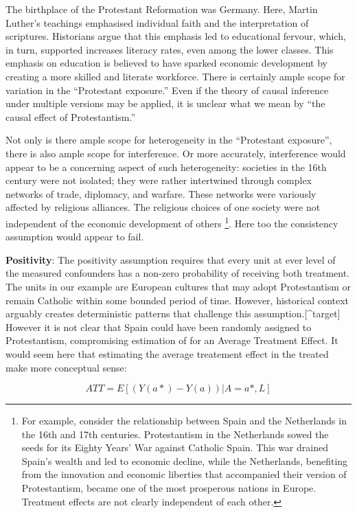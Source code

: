 \documentclass[
  singlecolumn]{report}
\begin{document}
The birthplace of the Protestant Reformation was Germany. Here, Martin
Luther's teachings emphasised individual faith and the interpretation of
scriptures. Historians argue that this emphasis led to educational
fervour, which, in turn, supported increases literacy rates, even among
the lower classes. This emphasis on education is believed to have
sparked economic development by creating a more skilled and literate
workforce. There is certainly ample scope for variation in the
``Protestant exposure.'' Even if the theory of causal inference under
multiple versions may be applied, it is unclear what we mean by ``the
causal effect of Protestantism.''

Not only is there ample scope for heterogeneity in the ``Protestant
exposure'', there is also ample scope for interference. Or more
accurately, interference would appear to be a concerning aspect of such
heterogeneity: societies in the 16th century were not isolated; they
were rather intertwined through complex networks of trade, diplomacy,
and warfare. These networks were variously affected by religious
alliances. The religious choices of one society were not independent of
the economic development of others \footnote{For example, consider the
  relationship between Spain and the Netherlands in the 16th and 17th
  centuries. Protestantism in the Netherlands sowed the seeds for its
  Eighty Years' War against Catholic Spain. This war drained Spain's
  wealth and led to economic decline, while the Netherlands, benefiting
  from the innovation and economic liberties that accompanied their
  version of Protestantism, became one of the most prosperous nations in
  Europe. Treatment effects are not clearly independent of each other.}.
Here too the consistency assumption would appear to fail.

\textbf{Positivity}: The positivity assumption requires that every unit
at ever level of the measured confounders has a non-zero probability of
receiving both treatment. The units in our example are European cultures
that may adopt Protestantism or remain Catholic within some bounded
period of time. However, historical context arguably creates
deterministic patterns that challenge this assumption.{[}\^{}target{]}
However it is not clear that Spain could have been randomly assigned to
Protestantism, compromising estimation of for an Average Treatment
Effect. It would seem here that estimating the average treatement effect
in the treated make more conceptual sense:

\[ATT = E[(Y(a*)- Y(a))|A = a*,L]\]
\end{document}
